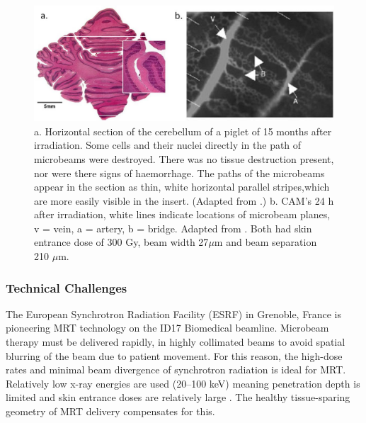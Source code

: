 	\begin{figure}
	\centering
	\includegraphics[width=\linewidth]{mrt_img/blattmann_mrt_hist}
	\caption{a. Horizontal section of the cerebellum of a piglet of 15 months after irradiation. Some cells and their nuclei directly in the path of microbeams were destroyed. There was no tissue destruction present, nor were there signs of haemorrhage. The paths of the microbeams appear in the section as thin, white horizontal parallel stripes,which are more easily visible in the insert. (Adapted from \cite{laissue2001weanling}.) b. CAM’s 24 h after irradiation, white lines indicate locations of microbeam planes, v = vein,  a = artery, b = bridge. Adapted from \cite{blattmann2005applications}. Both had skin entrance dose of 300 Gy, beam width 27$\mu$m and beam separation 210 $\mu$m.}
	\label{fig:blattmann_mrt_hist}
	\end{figure}
	

	
	\subsubsection{Technical Challenges}
	
	
	The European Synchrotron Radiation Facility (ESRF) in Grenoble, France is pioneering MRT technology on the ID17 Biomedical beamline. Microbeam therapy must be delivered rapidly, in highly collimated beams to avoid spatial blurring of the beam due to patient movement. For this reason, the high-dose rates and minimal beam divergence of synchrotron radiation is ideal for MRT. Relatively low x-ray energies are used (20--100 keV) meaning penetration depth is limited and skin entrance doses are relatively large \cite{blattmann2005applications}. The healthy tissue-sparing geometry of MRT delivery compensates for this.
	
